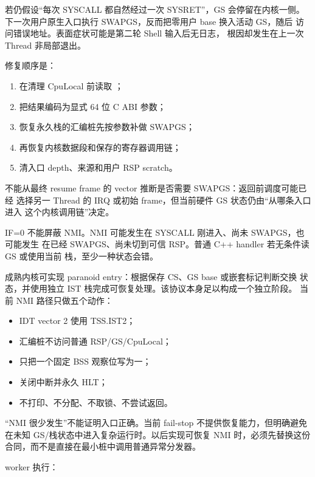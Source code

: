 若仍假设“每次 SYSCALL 都自然经过一次 SYSRET”，GS 会停留在内核一侧。
下一次用户原生入口执行 SWAPGS，反而把零用户 base 换入活动 GS，随后
\code{[gs:16]} 访问错误地址。表面症状可能是第二轮 Shell 输入后无日志，
根因却发生在上一次 Thread 非局部退出。

修复顺序是：

\begin{enumerate}[label=\arabic*.]
  \item 在清理 CpuLocal 前读取 ；
  \item 把结果编码为显式 64 位 C ABI 参数；
  \item 恢复永久栈的汇编桩先按参数补做 SWAPGS；
  \item 再恢复内核数据段和保存的寄存器调用链；
  \item {} 清入口 depth、来源和用户 RSP scratch。
\end{enumerate}

不能从最终 resume frame 的 vector 推断是否需要 SWAPGS：返回前调度可能已经
选择另一 Thread 的 IRQ 或初始 frame，但当前硬件 GS 状态仍由“从哪条入口进入
这个内核调用链”决定。

IF=0 不能屏蔽 NMI。NMI 可能发生在 SYSCALL 刚进入、尚未 SWAPGS，也可能发生
在已经 SWAPGS、尚未切到可信 RSP。普通 C++ handler 若无条件读 GS 或使用当前
栈，至少一种状态会错。

成熟内核可实现 paranoid entry：根据保存 CS、GS base 或嵌套标记判断交换
状态，并使用独立 IST 栈完成可恢复处理。该协议本身足以构成一个独立阶段。
当前 NMI 路径只做五个动作：

\begin{itemize}
  \item IDT vector 2 使用 TSS.IST2；
  \item 汇编桩不访问普通 RSP/GS/CpuLocal；
  \item 只把一个固定 BSS 观察位写为一；
  \item 关闭中断并永久 HLT；
  \item 不打印、不分配、不取锁、不尝试返回。
\end{itemize}

\begin{failurebox}
“NMI 很少发生”不能证明入口正确。当前 fail-stop 不提供恢复能力，但明确避免
在未知 GS/栈状态中进入复杂运行时。以后实现可恢复 NMI 时，必须先替换这份
合同，而不是直接在最小桩中调用普通异常分发器。
\end{failurebox}

worker 执行：

